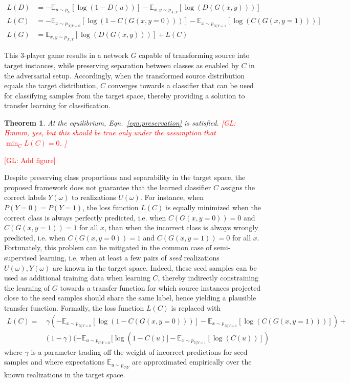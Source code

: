 \documentclass{article}
\newcommand{\glnote}[1]{\textcolor{red}{[GL: #1]}}
\theoremstyle{plain}
\newtheorem{theorem}{Theorem}
\begin{document}
\begin{align}
    L(D) &= -\mathbb{E}_{u \sim p_U} [\log(1 - D(u))] -\mathbb{E}_{x,y \sim p_{X,Y}} [\log(D(G(x, y)))] \\
    L(C) &= -\mathbb{E}_{x \sim p_{X|Y=0}} [\log(1 - C(G(x, y=0)))] -\mathbb{E}_{x \sim p_{X|Y=1}} [\log(C(G(x, y=1)))] \\
    L(G) &= \mathbb{E}_{x,y \sim p_{X,Y}} [\log(D(G(x, y)))] + L(C)
\end{align}

This 3-player game results in a network $G$
capable of transforming source into target instances, while preserving
separation between classes as enabled by $C$ in the adversarial setup.
Accordingly, when the transformed source distribution equals the
target distribution, $C$ converges towards a classifier that can be used
for classifying samples from the target space, thereby providing a solution
to transfer learning for classification.

\begin{theorem}
At the equilibrium, Eqn.~\ref{eqn:preservation} is satisfied. \glnote{Hmmm, yes, but this should be true only under the assumption that $\min_C L(C) = 0$. }
\end{theorem}

\glnote{Add figure}

Despite preserving class proportions and separability in the target space, the
proposed framework does not guarantee that the learned classifier $C$ assigns
the correct labels $Y(\omega)$ to realizations $U(\omega)$. For instance, when
$P(Y=0) = P(Y=1)$, the loss function $L(C)$ is equally minimized when the
correct class is always perfectly predicted, i.e. when $C(G(x,y=0)) = 0$ and
$C(G(x,y=1)) = 1$ for all $x$, than when the incorrect class is always wrongly
predicted,  i.e. when $C(G(x,y=0)) = 1$ and $C(G(x,y=1)) = 0$ for all $x$.
Fortunately, this problem can be mitigated in the common case of
semi-supervised learning, i.e. when at least a few pairs of {\it seed}
realizations $U(\omega), Y(\omega)$ are known in the target space. Indeed, these
seed samples can be used as additional training data when learning $C$, thereby
indirectly constraining the learning of $G$ towards a transfer function for
which source instances projected close to the seed samples should share the same
label, hence yielding a plausible transfer function. Formally,
the loss function $L(C)$ is replaced with
\begin{align}\label{eqn:loss-C-semi}
    L(C) =&~ \gamma (-\mathbb{E}_{x \sim p_{X|Y=0}} [\log(1 - C(G(x, y=0)))] -\mathbb{E}_{x \sim p_{X|Y=1}} [\log(C(G(x, y=1)))]) + \nonumber \\
          & (1 - \gamma) (-\mathbb{E}_{u \sim p_{U|Y=0}} [\log(1 - C(u)] -\mathbb{E}_{x \sim p_{U|Y=1}} [\log(C(u))])
\end{align}
where $\gamma$ is a parameter trading off the weight of incorrect predictions for seed samples
and where expectations $\mathbb{E}_{u \sim p_{U|Y}}$ are approximated empirically
over the known realizations in the target space.
\end{document}
